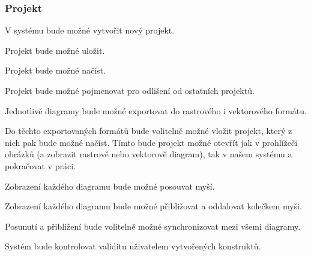\subsubsection*{Projekt}
\begin{enumfp}
  \item V systému bude možné vytvořit nový projekt.
  \item Projekt bude možné uložit.
  \item Projekt bude možné načíst.
  \item Projekt bude možné pojmenovat pro odlišení od ostatních projektů.
  \item Jednotlivé diagramy bude možné exportovat do rastrového i vektorového formátu.
  \item Do těchto exportovaných formátů bude volitelně možné vložit projekt, který z nich pak bude možné načíst.
  Tímto bude projekt možné otevřít jak v prohlížeči obrázků (a zobrazit rastrově nebo vektorově diagram), tak v našem systému a pokračovat v práci.
  \item Zobrazení každého diagramu bude možné posouvat myší.
  \item Zobrazení každého diagramu bude možné přibližovat a oddalovat kolečkem myši.
  \item Posunutí a přiblížení bude volitelně možné synchronizovat mezi všemi diagramy.
  \item Systém bude kontrolovat validitu uživatelem vytvořených konstruktů.
\end{enumfp}

